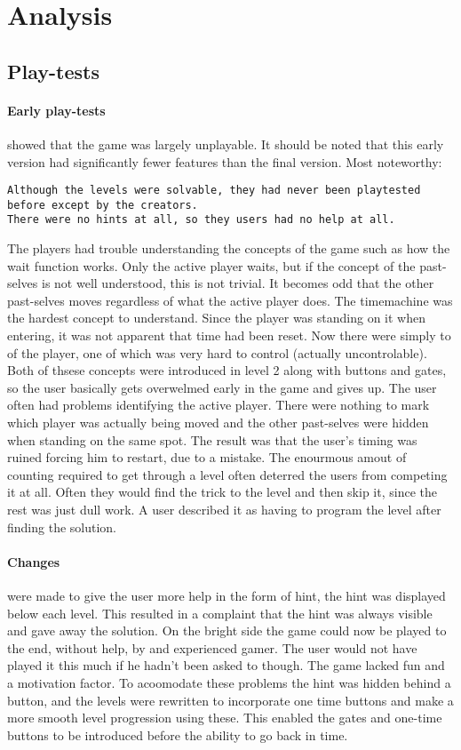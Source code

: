 \section{Analysis}
\subsection{Play-tests}
\paragraph{Early play-tests} showed that the game was largely unplayable. It should be noted that this early version had significantly fewer features than the final version. Most noteworthy:

\begin{lstlisting}
Although the levels were solvable, they had never been playtested before except by the creators.
There were no hints at all, so they users had no help at all.
\end{lstlisting}

The players had trouble understanding the concepts of the game such as how the wait function works. Only the active player waits, but if the concept of the past-selves is not well understood, this is not trivial. It becomes odd that the other past-selves moves regardless of what the active player does. The timemachine was the hardest concept to understand. Since the player was standing on it when entering, it was not apparent that time had been reset. Now there were simply to of the player, one of which was very hard to control (actually uncontrolable). Both of thsese concepts were introduced in level 2 along with buttons and gates, so the user basically gets overwelmed early in the game and gives up.
The user often had problems identifying the active player. There were nothing to mark which player was actually being moved and the other past-selves were hidden when standing on the same spot. The result was that the user's timing was ruined forcing him to restart, due to a mistake.
The enourmous amout of counting required to get through a level often deterred the users from competing it at all. Often they would find the trick to the level and then skip it, since the rest was just  dull work. A user described it as having to program the level after finding the solution.\\

\paragraph{Changes} were made to give the user more help in the form of hint, the hint was displayed below each level. This resulted in a complaint that the hint was always visible and gave away the solution. On the bright side the game could now be played to the end, without help, by and experienced gamer. The user would not have played it this much if he hadn't been asked to though. The game lacked fun and a motivation factor.
To acoomodate these problems the hint was hidden behind a button, and the levels were rewritten to incorporate one time buttons and make a more smooth level progression using these. This enabled the gates and one-time buttons to be introduced before the ability to go back in time.